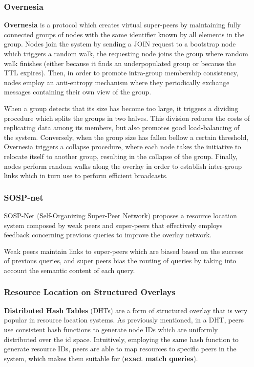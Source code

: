 \subsubsection*{Overnesia}

\textbf{Overnesia} \cite{leitao2014overnesia} is a protocol which creates virtual super-peers by maintaining fully connected groups of nodes with the same identifier known by all elements in the group. Nodes join the system by sending a JOIN request to a bootstrap node which triggers a random walk, the requesting node joins the group where random walk finishes (either because it finds an underpopulated group or because the TTL expires). Then, in order to promote intra-group membership consistency, nodes employ an anti-entropy mechanism where they periodically exchange messages containing their own view of the group. 

When a group detects that its size has become too large, it triggers a dividing procedure which splits the groups in two halves. This division reduces the costs of replicating data among its members, but also promotes good load-balancing of the system. Conversely, when the group size has fallen bellow a certain threshold, Overnesia triggers a collapse procedure, where each node takes the initiative to relocate itself to another group, resulting in the collapse of the group. Finally, nodes perform random walks along the overlay in order to establish inter-group links which in turn use to perform efficient broadcasts.

\subsubsection*{SOSP-net}

SOSP-Net \cite{garbacki2007optimizing}  (Self-Organizing Super-Peer Network) proposes a resource location system composed by weak peers and super-peers that effectively employs feedback concerning previous queries to improve the overlay network. 

Weak peers maintain links to super-peers which are biased based on the success of previous queries, and super peers bias the routing of queries by taking into account the semantic content of each query. 

\subsubsection{Resource Location on Structured Overlays}

\textbf{Distributed Hash Tables} (DHTs) are a form of structured overlay that is very popular in resource location systems. As previously mentioned, in a DHT, peers use consistent hash functions to generate node IDs which are uniformly distributed over the id space. Intuitively, employing the same hash function to generate resource IDs, peers are able to map resources to specific peers in the system, which makes them suitable for (\textbf{exact match queries}).

